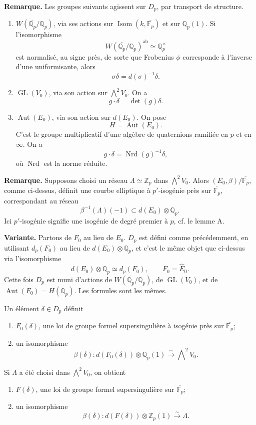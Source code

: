 \documentclass[11pt]{article}
\newcommand{\Fp}{\mathbb{F}_{p}}
\newcommand{\Qp}{\mathbb{Q}_{p}}
\newcommand{\Zp}{\mathbb{Z}_{p}}
\newcommand{\Isom}{\operatorname{Isom}}
\newcommand{\Aut}{\operatorname{Aut}}
\newcommand{\GL}{\operatorname{GL}}
\newcommand{\Nrd}{\operatorname{Nrd}}
\newcommand{\wh}{\widehat}
\begin{document}
\textbf{Remarque.} Les groupes suivants agissent sur \(D_p\), par transport de structure.
\begin{enumerate}[label=(\alph*)]
\item \(W(\overline{\Qp}/\Qp)\), via ses actions sur \(\Isom(k,\overline{\Fp})\) et sur \(\Qp(1)\). Si l'isomorphisme
\[
W(\overline{\Qp}/\Qp)^{\mathrm{ab}}\simeq\Qp^\times
\]
est normalisé, au signe près, de sorte que Frobenius \(\phi\) corresponde à l'inverse d'une uniformisante, alors
\[
\sigma\delta=d(\sigma)^{-1}\delta .
\]
\item \(\GL(V_0)\), via son action sur \(\bigwedge^2V_0\). On a
\[
g\cdot\delta=\det(g)\delta .
\]
\item \(\Aut(E_0)\), via son action sur \(d(E_0)\). On pose
\[
H=\Aut(E_0).
\]
C'est le groupe multiplicatif d'une algèbre de quaternions ramifiée en \(p\) et en \(\infty\). On a
\[
g\cdot\delta=\Nrd(g)^{-1}\delta ,
\]
où \(\Nrd\) est la norme réduite.
\end{enumerate}

\textbf{Remarque.} Supposons choisi un réseau \(\Lambda\simeq\Zp\) dans \(\bigwedge^2V_0\). Alors \((E_0,\beta)/\overline{\Fp}\), comme ci-dessus, définit une courbe elliptique à \(p'\)-isogénie près sur \(\overline{\Fp}\), correspondant au réseau
\[
\beta^{-1}(\Lambda)(-1)\subset d(E_0)\otimes\Qp .
\]
Ici \(p'\)-isogénie signifie une isogénie de degré premier à \(p\), cf. le lemme A.

\textbf{Variante.} Partons de \(F_0\) au lieu de \(E_0\). \(D_p\) est défini comme précédemment, en utilisant \(d_p(F_0)\) au lieu de \(d(E_0)\otimes\Qp\), et c'est le même objet que ci-dessus via l'isomorphisme
\[
d(E_0)\otimes\Qp\simeq d_p(F_0),\qquad F_0=\wh E_0 .
\]
Cette fois \(D_p\) est muni d'actions de \(W(\overline{\Qp}/\Qp)\), de \(\GL(V_0)\), et de \(\Aut(F_0)=H(\Qp)\). Les formules sont les mêmes.

Un élément \(\delta\in D_p\) définit
\begin{enumerate}[label=(\alph*)]
\item \(F_0(\delta)\), une loi de groupe formel supersingulière à isogénie près sur \(\overline{\Fp}\);
\item un isomorphisme
\[
\beta(\delta):d(F_0(\delta))\otimes\Qp(1)\xrightarrow{\sim}\bigwedge\nolimits^2V_0 .
\]
\end{enumerate}
Si \(\Lambda\) a été choisi dans \(\bigwedge^2V_0\), on obtient
\begin{enumerate}[label=(\alph*)]
\item \(F(\delta)\), une loi de groupe formel supersingulière sur \(\overline{\Fp}\);
\item un isomorphisme
\[
\beta(\delta):d(F(\delta))\otimes\Zp(1)\xrightarrow{\sim}\Lambda .
\]
\end{enumerate}
\end{document}
